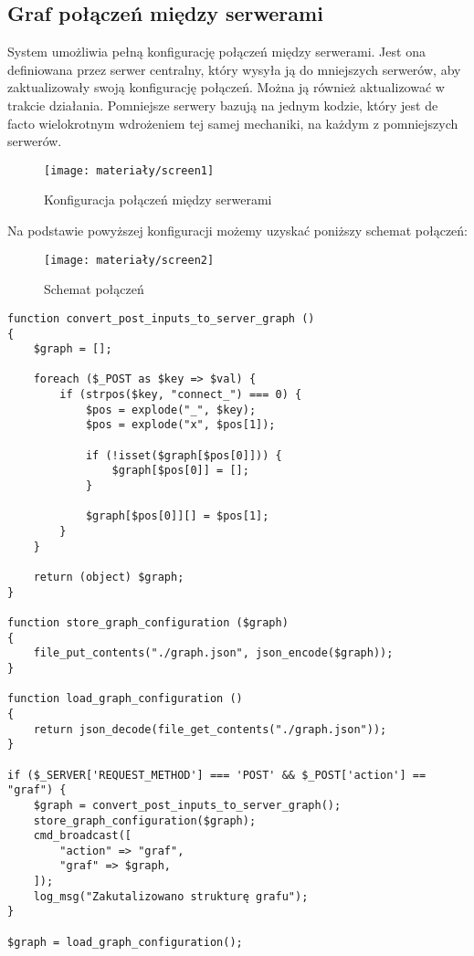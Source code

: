 \newpage
\subsection{Graf połączeń między serwerami}
System umożliwia pełną konfigurację połączeń między serwerami. Jest ona definiowana przez serwer centralny, który wysyła ją do mniejszych serwerów, aby zaktualizowały swoją konfigurację połączeń. Można ją również aktualizować w trakcie działania. Pomniejsze serwery bazują na jednym kodzie, który jest de facto wielokrotnym wdrożeniem tej samej mechaniki, na każdym z pomniejszych serwerów.

\begin{figure}[H]
	\centering
	\texttt{[image: materiały/screen1]}
	\caption{Konfiguracja połączeń między serwerami}
\end{figure}

\vspace{15pt}
Na podstawie powyższej konfiguracji możemy uzyskać poniższy schemat połączeń:

\begin{figure}[H]
	\centering
	\vspace{15pt}
	\texttt{[image: materiały/screen2]}
	\caption{Schemat połączeń}
\end{figure}

\newpage
\begin{empty}
	\begin{verbatim}
function convert_post_inputs_to_server_graph ()
{
	$graph = [];
	
	foreach ($_POST as $key => $val) {
		if (strpos($key, "connect_") === 0) {
			$pos = explode("_", $key);
			$pos = explode("x", $pos[1]);
			
			if (!isset($graph[$pos[0]])) {
				$graph[$pos[0]] = [];
			}
			
			$graph[$pos[0]][] = $pos[1];
		}
	}
	
	return (object) $graph;
}

function store_graph_configuration ($graph)
{
	file_put_contents("./graph.json", json_encode($graph));
}

function load_graph_configuration ()
{
	return json_decode(file_get_contents("./graph.json"));
}

if ($_SERVER['REQUEST_METHOD'] === 'POST' && $_POST['action'] == "graf") {
	$graph = convert_post_inputs_to_server_graph();
	store_graph_configuration($graph);
	cmd_broadcast([
		"action" => "graf",
		"graf" => $graph,
	]);
	log_msg("Zakutalizowano strukturę grafu");
}

$graph = load_graph_configuration();
	\end{verbatim}
\end{empty}

